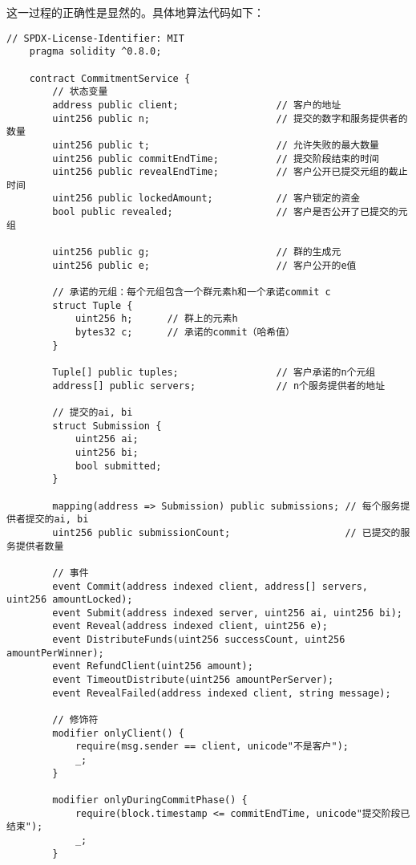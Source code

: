 这一过程的正确性是显然的。具体地算法代码如下：
\begin{lstlisting}[language=Solidity]
    // SPDX-License-Identifier: MIT
    pragma solidity ^0.8.0;
    
    contract CommitmentService {
        // 状态变量
        address public client;                 // 客户的地址
        uint256 public n;                      // 提交的数字和服务提供者的数量
        uint256 public t;                      // 允许失败的最大数量
        uint256 public commitEndTime;          // 提交阶段结束的时间
        uint256 public revealEndTime;          // 客户公开已提交元组的截止时间
        uint256 public lockedAmount;           // 客户锁定的资金
        bool public revealed;                  // 客户是否公开了已提交的元组
    
        uint256 public g;                      // 群的生成元
        uint256 public e;                      // 客户公开的e值
    
        // 承诺的元组：每个元组包含一个群元素h和一个承诺commit c
        struct Tuple {
            uint256 h;      // 群上的元素h
            bytes32 c;      // 承诺的commit（哈希值）
        }
    
        Tuple[] public tuples;                 // 客户承诺的n个元组
        address[] public servers;              // n个服务提供者的地址
    
        // 提交的ai, bi
        struct Submission {
            uint256 ai;
            uint256 bi;
            bool submitted;
        }
    
        mapping(address => Submission) public submissions; // 每个服务提供者提交的ai, bi
        uint256 public submissionCount;                    // 已提交的服务提供者数量
    
        // 事件
        event Commit(address indexed client, address[] servers, uint256 amountLocked);
        event Submit(address indexed server, uint256 ai, uint256 bi);
        event Reveal(address indexed client, uint256 e);
        event DistributeFunds(uint256 successCount, uint256 amountPerWinner);
        event RefundClient(uint256 amount);
        event TimeoutDistribute(uint256 amountPerServer);
        event RevealFailed(address indexed client, string message);
    
        // 修饰符
        modifier onlyClient() {
            require(msg.sender == client, unicode"不是客户");
            _;
        }
    
        modifier onlyDuringCommitPhase() {
            require(block.timestamp <= commitEndTime, unicode"提交阶段已结束");
            _;
        }
    

\end{lstlisting}
